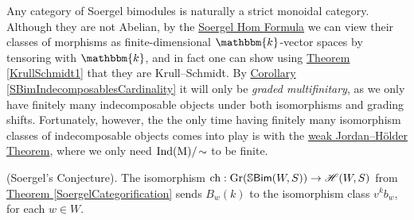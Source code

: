 \noindent%
Any category of Soergel bimodules is naturally a strict monoidal category. Although they are not Abelian, by the \hyperref[SoergelHom]{Soergel Hom Formula} we can view their classes of morphisms as finite-dimensional $\mathbbm{k}$-vector spaces by tensoring with $\mathbbm{k}$, and in fact one can show using \hyperref[KrullSchmidt1]{Theorem \ref*{KrullSchmidt1}} that they are Krull--Schmidt. By \hyperref[SBimIndecomposablesCardinality]{Corollary \ref*{SBimIndecomposablesCardinality}} it will only be {\em graded multifinitary}, as we only have finitely many indecomposable objects under both isomorphisms and grading shifts. Fortunately, however, the the only time having finitely many isomorphism classes of indecomposable objects comes into play is with the \hyperref[JordanHolder]{weak Jordan--H\"{o}lder Theorem}, where we only need $\textup{Ind}(\textup{M})/\!\sim$ to be finite.\\%

\noindent\begin{theorem}\label{SoergelConjecture}\textup{(Soergel's Conjecture).} The isomorphism $\textup{ch} : \textup{Gr}(\mathbb{S}\textnormal{\textsf{Bim}}(W, S)) \to \mathscr{H}(W, S)$ from \hyperref[SoergelCategorification]{Theorem \ref*{SoergelCategorification}} sends $B_w(k)$ to the isomorphism class $v^k b_w$, for each $w \in W$.\\
\end{theorem}

